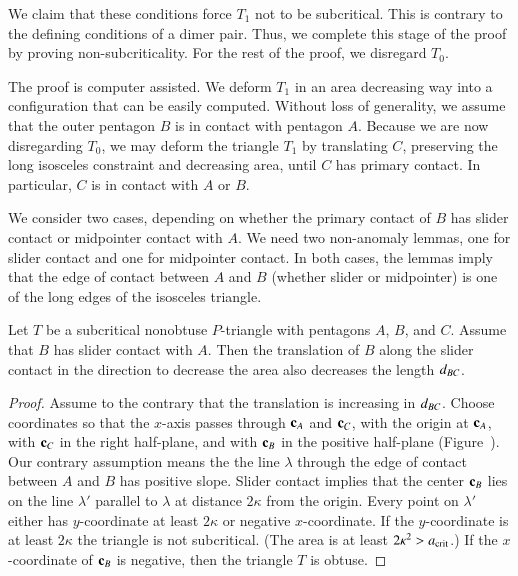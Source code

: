 We claim that these conditions force $T_1$ not to be subcritical.
This is contrary to the defining conditions of a dimer pair.  Thus, we
complete this stage of the proof by proving non-subcriticality. For
the rest of the proof, we disregard $T_0$.

The proof is computer assisted.  We deform $T_1$ in an area decreasing
way into a configuration that can be easily computed.  Without loss of
generality, we assume that the outer pentagon $B$ is in contact with
pentagon $A$.  Because we are now disregarding $T_0$, we may deform the
triangle $T_1$ by translating $C$, preserving the long isosceles constraint
and decreasing area, until $C$ has primary contact.  In particular,
$C$ is in contact with $A$ or $B$.

We consider two cases, depending on whether the primary contact of $B$
has slider contact or midpointer contact with $A$.  We need two
non-anomaly lemmas, one for slider contact and one for midpointer
contact.  In both cases, the lemmas imply that the edge of contact
between $A$ and $B$ (whether slider or midpointer) is one of the long
edges of the isosceles triangle.

\begin{lemma}  
  Let $T$ be a subcritical nonobtuse $P$-triangle with pentagons $A$,
  $B$, and $C$.  Assume that $B$ has slider contact with $A$.  Then
  the translation of $B$ along the slider contact in the direction to
  decrease the area also decreases the length $d_{BC}$.
\end{lemma}

\begin{proof} 
  Assume to the contrary that the translation is increasing in
  $d_{BC}$.  Choose coordinates so that the $x$-axis passes through
  ${\mathbf c}_A$ and ${\mathbf c}_C$, with the origin at ${\mathbf c}_A$, with ${\mathbf c}_C$ in the
  right half-plane, and with ${\mathbf c}_B$ in the positive half-plane
  (Figure~).  Our contrary assumption means the the
  line $\lambda$ through the edge of contact between $A$ and $B$ has
  positive slope.  Slider contact implies that the center ${\mathbf c}_B$ lies
  on the line $\lambda'$ parallel to $\lambda$ at distance $2\kappa$
  from the origin.  Every point on $\lambda'$ either has
  $y$-coordinate at least $2\kappa$ or negative $x$-coordinate.  If
  the $y$-coordinate is at least $2\kappa$ the triangle is not
  subcritical.  (The area is at least $2\kappa^2>a_\text{crit}$.) If the
  $x$-coordinate of ${\mathbf c}_B$ is negative, then the triangle $T$ is
  obtuse.
\end{proof}

